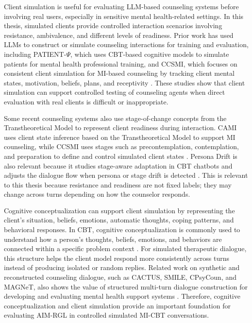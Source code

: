 Client simulation is useful for evaluating LLM-based counseling systems before involving real users, especially in sensitive mental health-related settings. In this thesis, simulated clients provide controlled interaction scenarios involving resistance, ambivalence, and different levels of readiness. Prior work has used LLMs to construct or simulate counseling interactions for training and evaluation, including PATIENT-\(\Psi\), which uses CBT-based cognitive models to simulate patients for mental health professional training, and CCSMI, which focuses on consistent client simulation for MI-based counseling by tracking client mental states, motivation, beliefs, plans, and receptivity \cite{wang2024patientpsi,yang2025consistent}. These studies show that client simulation can support controlled testing of counseling agents when direct evaluation with real clients is difficult or inappropriate.

Some recent counseling systems also use stage-of-change concepts from the Transtheoretical Model to represent client readiness during interaction. CAMI uses client state inference based on the Transtheoretical Model to support MI counseling, while CCSMI uses stages such as precontemplation, contemplation, and preparation to define and control simulated client states \cite{yang2025cami,yang2025consistent,prochaska1997transtheoretical,raihan2023stages}. Persona Drift is also relevant because it studies stage-aware adaptation in CBT chatbots and adjusts the dialogue flow when persona or stage drift is detected \cite{yun2025personadrift}. This is relevant to this thesis because resistance and readiness are not fixed labels; they may change across turns depending on how the counselor responds.

Cognitive conceptualization can support client simulation by representing the client's situation, beliefs, emotions, automatic thoughts, coping patterns, and behavioral responses. In CBT, cognitive conceptualization is commonly used to understand how a person's thoughts, beliefs, emotions, and behaviors are connected within a specific problem context \cite{beck2020cognitive}. For simulated therapeutic dialogue, this structure helps the client model respond more consistently across turns instead of producing isolated or random replies. Related work on synthetic and reconstructed counseling dialogue, such as CACTUS, SMILE, CPsyCoun, and MAGNeT, also shows the value of structured multi-turn dialogue construction for developing and evaluating mental health support systems \cite{lee2024cactus,qiu2024smile,zhang2024cpsycoun,mandal2025magnet}. Therefore, cognitive conceptualization and client simulation provide an important foundation for evaluating AIM-RGL in controlled simulated MI-CBT conversations.


